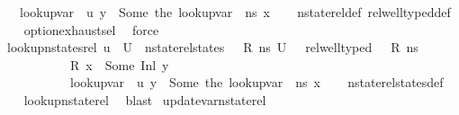 \begin{isabellebody}
\ \ \ lookup{\isacharunderscore}{\kern0pt}var\ {\isasymLambda}{\isacharprime}{\kern0pt}\ u\ y\ {\isacharequal}{\kern0pt}\ Some\ {\isacharparenleft}{\kern0pt}the\ {\isacharparenleft}{\kern0pt}lookup{\isacharunderscore}{\kern0pt}var\ {\isasymLambda}\ ns\ x{\isacharparenright}{\kern0pt}{\isacharparenright}{\kern0pt}{\isachardoublequoteclose}\isanewline
%
\isadelimproof
\ \ %
\endisadelimproof
%
\isatagproof
{}\isamarkupfalse%
\ nstate{\isacharunderscore}{\kern0pt}rel{\isacharunderscore}{\kern0pt}def\ rel{\isacharunderscore}{\kern0pt}well{\isacharunderscore}{\kern0pt}typed{\isacharunderscore}{\kern0pt}def\isanewline
\ \ \isamarkupfalse%
\ option{\isachardot}{\kern0pt}exhaust{\isacharunderscore}{\kern0pt}sel\ \isamarkupfalse%
\ force%
\endisatagproof
{\isafoldproof}%
%
\isadelimproof
\ \ \isanewline
%
\endisadelimproof
\isanewline
{}\isamarkupfalse%
\ lookup{\isacharunderscore}{\kern0pt}nstates{\isacharunderscore}{\kern0pt}rel{\isacharcolon}{\kern0pt}\ {\isachardoublequoteopen}u\ {\isasymin}\ U\ {\isasymLongrightarrow}\ nstate{\isacharunderscore}{\kern0pt}rel{\isacharunderscore}{\kern0pt}states\ {\isasymLambda}\ {\isasymLambda}{\isacharprime}{\kern0pt}\ R\ ns\ U\ {\isasymLongrightarrow}\ \ rel{\isacharunderscore}{\kern0pt}well{\isacharunderscore}{\kern0pt}typed\ {\isasymLambda}\ {\isasymOmega}\ R\ ns\ {\isasymLongrightarrow}\isanewline
\ \ \ \ \ \ \ \ \ \ \ R\ x\ {\isacharequal}{\kern0pt}\ Some\ {\isacharparenleft}{\kern0pt}Inl\ y{\isacharparenright}{\kern0pt}\ {\isasymLongrightarrow}\ \isanewline
\ \ \ \ \ \ \ \ \ \ \ lookup{\isacharunderscore}{\kern0pt}var\ {\isasymLambda}{\isacharprime}{\kern0pt}\ u\ y\ {\isacharequal}{\kern0pt}\ Some\ {\isacharparenleft}{\kern0pt}the\ {\isacharparenleft}{\kern0pt}lookup{\isacharunderscore}{\kern0pt}var\ {\isasymLambda}\ ns\ x{\isacharparenright}{\kern0pt}{\isacharparenright}{\kern0pt}{\isachardoublequoteclose}\isanewline
%
\isadelimproof
\ \ %
\endisadelimproof
%
\isatagproof
{}\isamarkupfalse%
\ nstate{\isacharunderscore}{\kern0pt}rel{\isacharunderscore}{\kern0pt}states{\isacharunderscore}{\kern0pt}def\isanewline
\ \ \isamarkupfalse%
\ lookup{\isacharunderscore}{\kern0pt}nstate{\isacharunderscore}{\kern0pt}rel\ \isamarkupfalse%
\ blast%
\endisatagproof
{\isafoldproof}%
%
\isadelimproof
\isanewline
%
\endisadelimproof
\isanewline
{}\isamarkupfalse%
\ update{\isacharunderscore}{\kern0pt}var{\isacharunderscore}{\kern0pt}nstate{\isacharunderscore}{\kern0pt}rel{\isacharcolon}{\kern0pt}\isanewline

\end{isabellebody}
